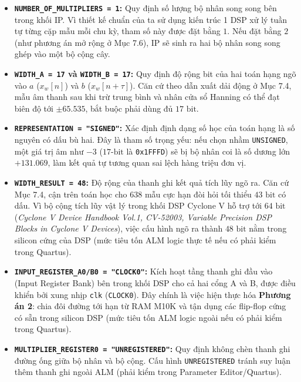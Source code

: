 \begin{itemize}[leftmargin=1.5em, itemsep=4pt]
    \item \textbf{\texttt{NUMBER\_OF\_MULTIPLIERS = 1}:}
    Quy định số lượng bộ nhân song song bên trong khối IP. Vì thiết kế chuẩn của ta sử dụng kiến trúc 1 DSP xử lý tuần tự từng cặp mẫu mỗi chu kỳ, tham số này được đặt bằng $1$. Nếu đặt bằng $2$ (như phương án mở rộng ở Mục 7.6), IP sẽ sinh ra hai bộ nhân song song ghép vào một bộ cộng cây.
    
    \item \textbf{\texttt{WIDTH\_A = 17} và \texttt{WIDTH\_B = 17}:}
    Quy định độ rộng bit của hai toán hạng ngõ vào $a$ ($x_w[n]$) và $b$ ($x_w[n+\tau]$). Căn cứ theo dẫn xuất dải động ở Mục 7.4, mẫu âm thanh sau khi trừ trung bình và nhân cửa sổ Hanning có thể đạt biên độ tới $\pm 65.535$, bắt buộc phải dùng đủ $17\text{ bit}$.
    
    \item \textbf{\texttt{REPRESENTATION = "SIGNED"}:}
    Xác định định dạng số học của toán hạng là số nguyên có dấu bù hai. Đây là tham số trọng yếu: nếu chọn nhầm \texttt{UNSIGNED}, một giá trị âm như $-3$ ($17\text{-bit}$ là \texttt{0x1FFFD}) sẽ bị bộ nhân coi là số dương lớn $+131.069$, làm kết quả tự tương quan sai lệch hàng triệu đơn vị.
    
    \item \textbf{\texttt{WIDTH\_RESULT = 48}:}
    Độ rộng của thanh ghi kết quả tích lũy ngõ ra. Căn cứ Mục 7.4, cận trên toán học cho 638 mẫu cực hạn đòi hỏi tối thiểu $43\text{ bit}$ có dấu. Vì bộ cộng tích lũy vật lý trong khối DSP Cyclone V hỗ trợ tới $64\text{ bit}$ (\emph{Cyclone V Device Handbook Vol.1, CV-52003, Variable Precision DSP Blocks in Cyclone V Devices}), việc cấu hình ngõ ra thành $48\text{ bit}$ nằm trong silicon cứng của DSP (mức tiêu tốn ALM logic thực tế nếu có phải kiểm trong Quartus).
    
    \item \textbf{\texttt{INPUT\_REGISTER\_A0/B0 = "CLOCK0"}:}
    Kích hoạt tầng thanh ghi đầu vào (Input Register Bank) bên trong khối DSP cho cả hai cổng A và B, được điều khiển bởi xung nhịp \texttt{clk} (\texttt{CLOCK0}). Đây chính là việc hiện thực hóa \textbf{Phương án 2}: chia đôi đường tới hạn từ RAM M10K và tận dụng các flip-flop cứng có sẵn trong silicon DSP (mức tiêu tốn ALM logic ngoài nếu có phải kiểm trong Quartus).
    
    \item \textbf{\texttt{MULTIPLIER\_REGISTER0 = "UNREGISTERED"}:}
    Quy định không chèn thanh ghi đường ống giữa bộ nhân và bộ cộng. Cấu hình \texttt{UNREGISTERED} tránh suy luận thêm thanh ghi ngoài ALM (phải kiểm trong Parameter Editor/Quartus).
    

\end{itemize}
